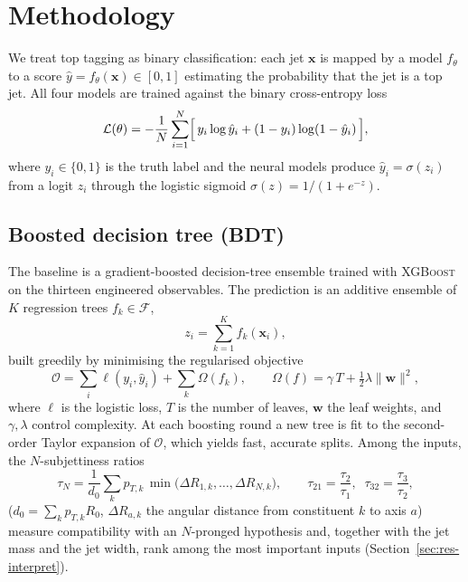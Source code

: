 \documentclass[preprint,12pt]{elsarticle}
\begin{document}
\section{Methodology}
\label{sec:methodology}

We treat top tagging as binary classification: each jet $\mathbf{x}$ is mapped
by a model $f_\theta$ to a score $\hat{y}=f_\theta(\mathbf{x})\in[0,1]$
estimating the probability that the jet is a top jet. All four models are
trained against the binary cross-entropy loss
\begin{equation}
\mathcal{L}(\theta) = -\frac{1}{N}\sum_{i=1}^{N}
\Bigl[\, y_i\log\hat{y}_i + (1-y_i)\log(1-\hat{y}_i) \,\Bigr],
\label{eq:bce}
\end{equation}
where $y_i\in\{0,1\}$ is the truth label and the neural models produce
$\hat{y}_i=\sigma(z_i)$ from a logit $z_i$ through the logistic sigmoid
$\sigma(z)=1/(1+e^{-z})$.

\subsection{Boosted decision tree (BDT)}
\label{sec:bdt}
The baseline is a gradient-boosted decision-tree ensemble trained with
\textsc{XGBoost} \citep{chen2016xgboost} on the thirteen engineered
observables. The prediction is an additive ensemble of $K$ regression trees
$f_k\in\mathcal{F}$,
\begin{equation}
z_i = \sum_{k=1}^{K} f_k(\mathbf{x}_i),
\label{eq:bdt-ensemble}
\end{equation}
built greedily by minimising the regularised objective
\begin{equation}
\mathcal{O} = \sum_{i} \ell(y_i,\hat{y}_i)
            + \sum_{k}\Omega(f_k), \qquad
\Omega(f) = \gamma\,T + \tfrac{1}{2}\lambda\lVert\mathbf{w}\rVert^{2},
\label{eq:xgb-obj}
\end{equation}
where $\ell$ is the logistic loss, $T$ is the number of leaves, $\mathbf{w}$
the leaf weights, and $\gamma,\lambda$ control complexity. At each boosting
round a new tree is fit to the second-order Taylor expansion of $\mathcal{O}$,
which yields fast, accurate splits. Among the inputs, the $N$-subjettiness
ratios \citep{thaler2011}
\begin{equation}
\tau_N = \frac{1}{d_0}\sum_{k} p_{T,k}\,
\min\bigl(\Delta R_{1,k},\dots,\Delta R_{N,k}\bigr), \qquad
\tau_{21}=\frac{\tau_2}{\tau_1},\;\; \tau_{32}=\frac{\tau_3}{\tau_2},
\label{eq:nsub}
\end{equation}
($d_0=\sum_k p_{T,k}R_0$, $\Delta R_{a,k}$ the angular distance from
constituent $k$ to axis $a$) measure compatibility with an $N$-pronged
hypothesis and, together with the jet mass and the jet width, rank among the
most important inputs (Section~\ref{sec:res-interpret}).
\end{document}
